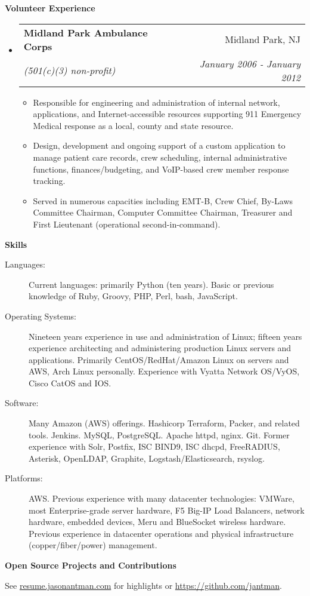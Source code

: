 \documentclass[letterpaper,11pt]{article}
\makeatletter
\newcommand{\resitem}[1]{\item #1 \vspace{-2pt}}
\newcommand{\resheading}[1]{{\large \colorbox{mygrey}{\begin{minipage}{\textwidth}{\textbf{#1 \vphantom{p\^{E}}}}\end{minipage}}}}
\newcommand{\ressubheading}[4]{
\begin{tabular*}{7.0in}{l@{\extracolsep{\fill}}r}
		\textbf{#1} & #2 \\
		\textit{#3} & \textit{#4} \\
\end{tabular*}\vspace{-6pt}}
\makeatother
\begin{document}
\resheading{Volunteer Experience}
\begin{itemize}
\item
        \ressubheading{Midland Park Ambulance Corps}{Midland Park, NJ}{(501(c)(3) non-profit)}{January 2006 - January 2012}
        \begin{itemize}
                \resitem{Responsible for engineering and administration of internal network, applications, and Internet-accessible resources supporting 911 Emergency Medical response as a local, county and state resource.}
                \resitem{Design, development and ongoing support of a custom application to manage patient care records, crew scheduling, internal administrative functions, finances/budgeting, and VoIP-based crew member response tracking.}
                \resitem{Served in numerous capacities including EMT-B, Crew Chief, By-Laws Committee Chairman, Computer Committee Chairman, Treasurer and First Lieutenant (operational second-in-command).}
        \end{itemize}
\end{itemize}

\resheading{Skills}

\begin{description}
\item[Languages:]
Current languages: primarily Python (ten years). Basic or previous knowledge of Ruby, Groovy, PHP, Perl, bash, JavaScript.
\item[Operating Systems:]
Nineteen years experience in use and administration of Linux; fifteen years experience architecting and administering production Linux servers and applications.
Primarily CentOS/RedHat/Amazon Linux on servers and AWS, Arch Linux personally. Experience with Vyatta Network OS/VyOS, Cisco CatOS and IOS.
\item[Software:]
Many Amazon (AWS) offerings. Hashicorp Terraform, Packer, and related tools. Jenkins. MySQL, PostgreSQL. Apache httpd, nginx. Git.
Former experience with Solr, Postfix, ISC BIND9, ISC dhcpd, FreeRADIUS, Asterisk, OpenLDAP, Graphite, Logstash/Elasticsearch, rsyslog.

\item[Platforms:]
AWS. Previous experience with many datacenter technologies: VMWare, most Enterprise-grade server hardware, F5 Big-IP Load Balancers, network hardware, embedded devices, Meru and BlueSocket wireless hardware. Previous experience in datacenter operations and physical infrastructure (copper/fiber/power) management.
\end{description}

\resheading{Open Source Projects and Contributions}
\begin{description}
\item{See \href{http://resume.jasonantman.com}{resume.jasonantman.com} for highlights or \href{https://github.com/jantman}{https://github.com/jantman}.}
\end{description}
\end{document}
